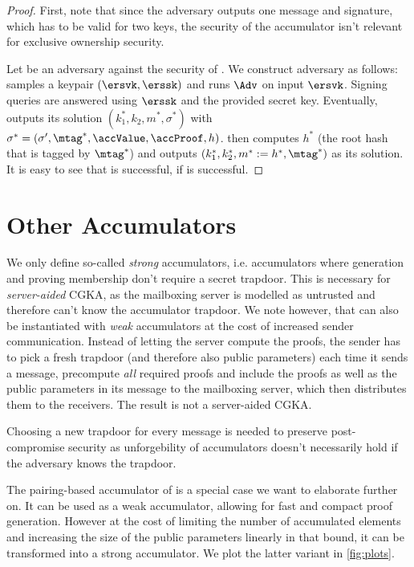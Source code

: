 \begin{proof}
  First, note that since the adversary outputs one message and signature, which has to be valid for two keys, the
  security of the accumulator isn't relevant for exclusive ownership security.

  Let \Adv be an adversary against the \ssceo security of \ers.  We construct adversary \Bdv as follows: \Bdv samples a
  keypair $(\ersvk,\erssk)$ and runs $\Adv$ on input $\ersvk$. Signing queries are answered using $\erssk$ and the
  provided secret key. Eventually, \Adv outputs its solution $(k_1^*,k_2, m^*, \sigma^*)$ with
  $\sigma^* = (\sigma', \mtag^*, \accValue,\accProof, h)$. \Bdv then computes $h^*$ (the root hash that is tagged by
  $\mtag^*$) and outputs $(k_1^*,k_2^*,m^* := h^*,\mtag^*)$ as its solution.  It is easy to see that \Bdv is successful,
  if \Adv is successful.
\end{proof}

\section{Other Accumulators}\label{sec:tdacc}
We only define so-called \emph{strong} accumulators, i.e. accumulators where generation and proving membership don't require a
secret trapdoor. This is necessary for \emph{server-aided} CGKA, as the mailboxing server is modelled as untrusted and
therefore can't know the accumulator trapdoor. We note however,
that \saik can also be instantiated with \emph{weak} accumulators at the cost of increased sender communication. Instead
of letting the server compute the proofs, the sender has to pick a fresh trapdoor (and therefore also public parameters)
each time it sends a message, precompute \emph{all} required proofs and include the proofs as well as the public
parameters in its message to the mailboxing server, which then distributes them to the receivers. The result is not a
server-aided CGKA.

Choosing a new trapdoor for every message is needed to preserve post-compromise security as unforgebility of
accumulators doesn't necessarily hold if the adversary knows the trapdoor.

The pairing-based accumulator of \cite{RSA:LNguyen05} is a special case we want to elaborate further on. It can be used
as a weak accumulator, allowing for fast and compact proof generation. However at the cost of limiting the number of
accumulated elements and increasing the size of the public parameters linearly in that bound, it can be transformed into
a strong accumulator. We plot the latter variant in \cref{fig:plots}.

